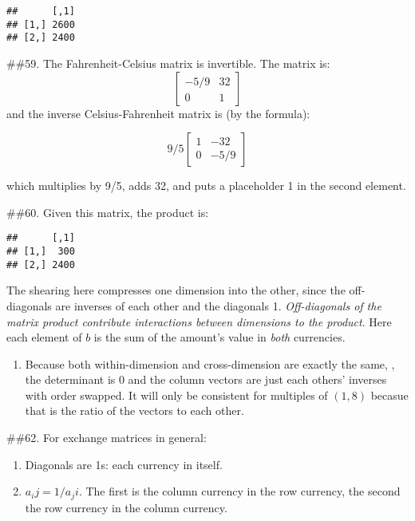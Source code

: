 \documentclass[]{article}
\newenvironment{Shaded}{\begin{snugshade}}{\end{snugshade}}
\newcommand{\DataTypeTok}[1]{\textcolor[rgb]{0.00,0.34,0.68}{#1}}
\newcommand{\DecValTok}[1]{\textcolor[rgb]{0.69,0.50,0.00}{#1}}
\newcommand{\KeywordTok}[1]{\textcolor[rgb]{0.12,0.11,0.11}{\textbf{#1}}}
\newcommand{\NormalTok}[1]{\textcolor[rgb]{0.12,0.11,0.11}{#1}}
\newcommand{\OperatorTok}[1]{\textcolor[rgb]{0.12,0.11,0.11}{#1}}
\newcommand{\StringTok}[1]{\textcolor[rgb]{0.75,0.01,0.01}{#1}}
\providecommand{\tightlist}{%
  \setlength{\itemsep}{0pt}\setlength{\parskip}{0pt}}
\newcommand{\m}[1]{\begin{bmatrix}#1\end{bmatrix}}
\begin{document}
\begin{verbatim}
##      [,1]
## [1,] 2600
## [2,] 2400
\end{verbatim}

\#\#59. The Fahrenheit-Celsius matrix is invertible. The matrix is:
\[\m{-5/9&32\\
0&1}\] and the inverse Celsius-Fahrenheit matrix is (by the formula):

\[9/5\m{1&-32\\
0&-5/9}\]

which multiplies by 9/5, adds 32, and puts a placeholder 1 in the second
element.

\#\#60. Given this matrix, the product is:

\begin{Shaded}
\end{Shaded}

\begin{verbatim}
##      [,1]
## [1,]  300
## [2,] 2400
\end{verbatim}

The shearing here compresses one dimension into the other, since the
off-diagonals are inverses of each other and the diagonals 1.
\emph{Off-diagonals of the matrix product contribute interactions
between dimensions to the product}. Here each element of \(b\) is the
sum of the amount's value in \emph{both} currencies.

\begin{enumerate}
\def\labelenumi{\alph{enumi}.}
\setcounter{enumi}{1}
\tightlist
\item
  Because both within-dimension and cross-dimension are exactly the
  same, , the determinant is 0 and the column vectors are just each
  others' inverses with order swapped. It will only be consistent for
  multiples of \((1,8)\) becasue that is the ratio of the vectors to
  each other.
\end{enumerate}

\#\#62. For exchange matrices in general:

\begin{enumerate}
\def\labelenumi{\alph{enumi}.}
\tightlist
\item
  Diagonals are 1s: each currency in itself.
\item
  \(a_ij=1/a_ji\). The first is the column currency in the row currency,
  the second the row currency in the column currency.
\end{enumerate}
\end{document}
